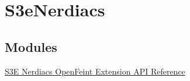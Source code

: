 \hypertarget{group__s3e_nerdiacs}{
\section{S3eNerdiacs}
\label{group__s3e_nerdiacs}
}
\subsection*{Modules}
\begin{DoxyCompactItemize}
\item 
\hyperlink{group___n_open_feint_api_group}{S3E Nerdiacs OpenFeint Extension API Reference}
\end{DoxyCompactItemize}

